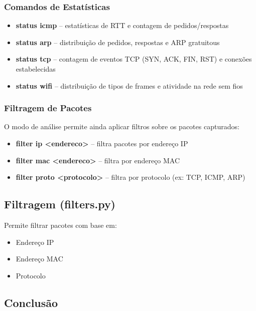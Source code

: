 \documentclass[a4paper,12pt]{article}
\begin{document}
\subsubsection*{Comandos de Estatísticas}

\begin{itemize}

\item \textbf{status icmp} – estatísticas de RTT e contagem de pedidos/respostas  
\item \textbf{status arp} – distribuição de pedidos, respostas e ARP gratuitous  
\item \textbf{status tcp} – contagem de eventos TCP (SYN, ACK, FIN, RST) e conexões estabelecidas  
\item \textbf{status wifi} – distribuição de tipos de frames e atividade na rede sem fios  

\end{itemize}

\subsubsection*{Filtragem de Pacotes}

O modo de análise permite ainda aplicar filtros sobre os pacotes capturados:

\begin{itemize}

\item \textbf{filter ip <endereco>} – filtra pacotes por endereço IP  
\item \textbf{filter mac <endereco>} – filtra por endereço MAC  
\item \textbf{filter proto <protocolo>} – filtra por protocolo (ex: TCP, ICMP, ARP)

\end{itemize}

\subsection{Filtragem (filters.py)}

Permite filtrar pacotes com base em:

\begin{itemize}
    \item Endereço IP
    \item Endereço MAC
    \item Protocolo
\end{itemize}

\subsection{Conclusão}
\end{document}
